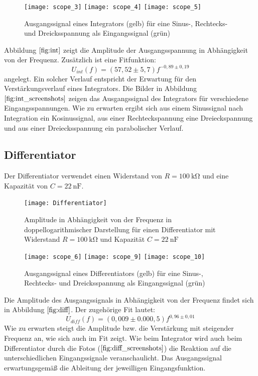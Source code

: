 \begin{figure}
\centering
\texttt{[image: scope\_3]}
\texttt{[image: scope\_4]}
\texttt{[image: scope\_5]}
\caption{Ausgangssignal eines Integrators (gelb) für eine Sinus-, Rechtecks- und Dreicksspannung als Eingangssignal (grün)}
\label{fig:int_screenshots}
\end{figure}
Abbildung $\ref{fig:int}$ zeigt die Amplitude der Ausgangsspannung in Abhängigkeit von der Frequenz. Zusätzlich ist eine Fitfunktion:
\begin{equation}
U_{int}(f)=(57,52\pm5,7)f^{-0,89\pm0,19}
\end{equation}
angelegt. Ein solcher Verlauf entspricht der Erwartung für den Verstärkungsverlauf eines Integrators.
Die Bilder in Abbildung $\ref{fig:int_screenshots}$ zeigen das Ausgangssignal des Integrators für verschiedene Eingangsspannungen. Wie zu erwarten ergibt sich aus einem Sinussignal nach Integration ein Kosinussignal, aus einer Rechteckspannung eine Dreieckspannung und aus einer Dreiecksspannung ein parabolischer Verlauf.
\subsection{Differentiator}
Der Differentiator verwendet einen Widerstand von $R=\SI{100}{\kilo\ohm}$ und eine Kapazität von $C=\SI{22}{\nano\farad}$.
\begin{figure}
\centering
\texttt{[image: Differentiator]}
\caption{Amplitude in Abhängigkeit von der Frequenz in doppellogarithmischer Darstellung für einen Differentiator mit Widerstand $R=\SI{100}{\kilo\ohm}$ und Kapazität $C=\SI{22}{\nano\farad}$}
\label{fig:diff}
\end{figure}
\begin{figure}
\centering
\texttt{[image: scope\_6]}
\texttt{[image: scope\_9]}
\texttt{[image: scope\_10]}
\caption{Ausgangssignal eines Differentiators (gelb) für eine Sinus-, Rechtecks- und Dreicksspannung als Eingangssignal (grün)}
\label{fig:diff_screenshots}
\end{figure}
Die Amplitude des Ausgangssignals in Abhängigkeit von der Frequenz findet sich in Abbildung $\ref{fig:diff}$. Der zugehörige Fit lautet:
\begin{equation}
U_{diff}(f)=(0,009\pm0.000,5)f^{0,96\pm0,01}
\end{equation}
Wie zu erwarten steigt die Amplitude bzw. die Verstärkung mit steigender Frequenz an, wie sich auch im Fit zeigt.
Wie beim Integrator wird auch beim Differentiator durch die Fotos ($\ref{fig:diff_screenshots}$) die Reaktion auf die unterschiedlichen Eingangssignale veranschaulicht. Das Ausgangssignal erwartungsgemäß die Ableitung der jeweilligen Eingangsfunktion.
